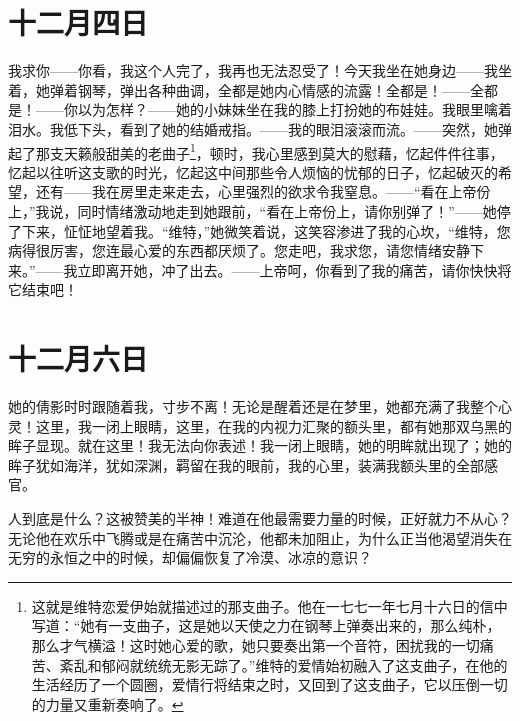 \documentclass[12pt,oneside]{book}
\begin{document}
\chapter{十二月四日}
\label{sec-4-33}
我求你——你看，我这个人完了，我再也无法忍受了！今天我坐在她身边——我坐着，她弹着钢琴，弹出各种曲调，全都是她内心情感的流露！全都是！——全都是！——你以为怎样？——她的小妹妹坐在我的膝上打扮她的布娃娃。我眼里噙着泪水。我低下头，看到了她的结婚戒指。——我的眼泪滚滚而流。——突然，她弹起了那支天籁般甜美的老曲子\footnote{这就是维特恋爱伊始就描述过的那支曲子。他在一七七一年七月十六日的信中写道：“她有一支曲子，这是她以天使之力在钢琴上弹奏出来的，那么纯朴，那么才气横溢！这时她心爱的歌，她只要奏出第一个音符，困扰我的一切痛苦、紊乱和郁闷就统统无影无踪了。”维特的爱情始初融入了这支曲子，在他的生活经历了一个圆圈，爱情行将结束之时，又回到了这支曲子，它以压倒一切的力量又重新奏响了。}，顿时，我心里感到莫大的慰藉，忆起件件往事，忆起以往听这支歌的时光，忆起这中间那些令人烦恼的忧郁的日子，忆起破灭的希望，还有——我在房里走来走去，心里强烈的欲求令我窒息。——“看在上帝份上，”我说，同时情绪激动地走到她跟前，“看在上帝份上，请你别弹了！”——她停了下来，怔怔地望着我。“维特，”她微笑着说，这笑容渗进了我的心坎，“维特，您病得很厉害，您连最心爱的东西都厌烦了。您走吧，我求您，请您情绪安静下来。”——我立即离开她，冲了出去。——上帝呵，你看到了我的痛苦，请你快快将它结束吧！
　　

\chapter{十二月六日}
\label{sec-4-34}
她的倩影时时跟随着我，寸步不离！无论是醒着还是在梦里，她都充满了我整个心灵！这里，我一闭上眼睛，这里，在我的内视力汇聚的额头里，都有她那双乌黑的眸子显现。就在这里！我无法向你表述！我一闭上眼睛，她的明眸就出现了；她的眸子犹如海洋，犹如深渊，羁留在我的眼前，我的心里，装满我额头里的全部感官。

人到底是什么？这被赞美的半神！难道在他最需要力量的时候，正好就力不从心？无论他在欢乐中飞腾或是在痛苦中沉沦，他都未加阻止，为什么正当他渴望消失在无穷的永恒之中的时候，却偏偏恢复了冷漠、冰凉的意识？
\end{document}
